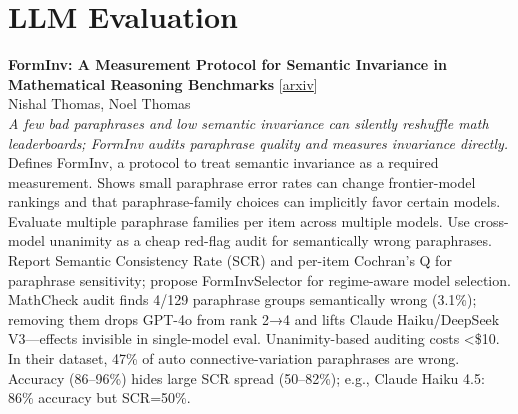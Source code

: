 \documentclass[12pt,letterpaper]{article}
\begin{document}
\medskip


\section*{LLM Evaluation}

{\small\textbf{FormInv: A Measurement Protocol for Semantic Invariance in Mathematical Reasoning Benchmarks}} {\scriptsize[\href{https://arxiv.org/abs/2605.29001}{arxiv}]}\\
{\scriptsize Nishal Thomas, Noel Thomas}\\

{\small\textit{A few bad paraphrases and low semantic invariance can silently reshuffle math leaderboards; FormInv audits paraphrase quality and measures invariance directly.}}\\[1pt]
{\footnotesize Defines FormInv, a protocol to treat semantic invariance as a required measurement. Shows small paraphrase error rates can change frontier-model rankings and that paraphrase-family choices can implicitly favor certain models. Evaluate multiple paraphrase families per item across multiple models. Use cross-model unanimity as a cheap red-flag audit for semantically wrong paraphrases. Report Semantic Consistency Rate (SCR) and per-item Cochran's Q for paraphrase sensitivity; propose FormInvSelector for regime-aware model selection. MathCheck audit finds 4/129 paraphrase groups semantically wrong (3.1\%); removing them drops GPT-4o from rank 2→4 and lifts Claude Haiku/DeepSeek V3---effects invisible in single-model eval. Unanimity-based auditing costs <\$10. In their dataset, 47\% of auto connective-variation paraphrases are wrong. Accuracy (86--96\%) hides large SCR spread (50--82\%); e.g., Claude Haiku 4.5: 86\% accuracy but SCR=50\%.}

\medskip
\end{document}
